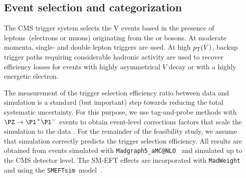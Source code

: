 \documentclass[a4paper,11pt]{article}
\newcommand{\Pb}{{{\Pqb}}\xspace}
\newcommand{\PAb}{{{{\Paqb}}}\xspace}
\renewcommand{\PV}{{{{V}}}\xspace}
\newcommand{\VH}{{{\PV}{\PH}}\xspace}
\begin{document}

\subsection{Event selection and categorization}

The CMS trigger system selects the \VH events based in the presence of leptons~(electrons or muons) originating from the \PW or \PZ bosons. 
At moderate momenta, single- and double lepton triggers are used.
At high $\pt(\PV)$, backup trigger paths requiring considerable hadronic activity are used to recover
efficiency losses for events with highly asymmetrical $\PV$ decay or with a highly energetic electron. 

The measurement of the trigger selection efficiency ratio between data and simulation is a standard (but important) step towards reducing the total systematic uncertainty.
For this purpose, we use tag-and-probe methods with $\PZ \to {\Pl}^{+} {\Pl}^{-}$ events to obtain event-level corrections factors that scale the simulation to the data . 
For the remainder of the feasibility study, we assume that simulation correctly predicts the trigger selection efficiency. 
All results are obtained from events simulated with \texttt{Madgraph5\_aMC@NLO}~\cite{Alwall:2014hca} and simulated up to the CMS detector level. 
The SM-EFT effects are incorporated with \texttt{MadWeight}~\cite{Artoisenet:2008zz} and using the \texttt{SMEFTsim}~model~\cite{Brivio:2017btx}.
\end{document}

